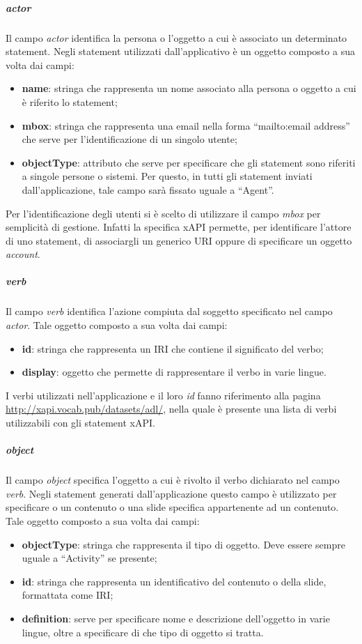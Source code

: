 \documentclass[../Tesi.tex]{subfiles}
\begin{document}
					\subparagraph{actor}
					Il campo \textit{actor} identifica la persona o l'oggetto a cui è associato un determinato statement. Negli statement utilizzati dall'applicativo è un oggetto composto a sua volta dai campi:
					\begin{itemize}
						\item \textbf{name}: stringa che rappresenta un nome associato alla persona o oggetto a cui è riferito lo statement;
						\item \textbf{mbox}: stringa che rappresenta una email nella forma ``mailto:email address'' che serve per l'identificazione di un singolo utente; 
						\item \textbf{objectType}: attributo che serve per specificare che gli statement sono riferiti a singole persone o sistemi. Per questo, in tutti gli statement inviati dall'applicazione, tale campo sarà fissato uguale a ``Agent''.
					\end{itemize}
					Per l'identificazione degli utenti si è scelto di utilizzare il campo \textit{mbox} per semplicità di gestione. Infatti la specifica xAPI permette, per identificare l'attore di uno statement, di associargli un generico URI oppure di specificare un oggetto \textit{account}.

					\subparagraph{verb}
					Il campo \textit{verb} identifica l'azione compiuta dal soggetto specificato nel campo \textit{actor}. Tale oggetto composto a sua volta dai campi:
					\begin{itemize}
						\item \textbf{id}: stringa che rappresenta un IRI che contiene il significato del verbo;
						\item \textbf{display}: oggetto che permette di rappresentare il verbo in varie lingue.
					\end{itemize}
					I verbi utilizzati nell'applicazione e il loro \textit{id} fanno riferimento alla pagina \url{http://xapi.vocab.pub/datasets/adl/}, nella quale è presente una lista di verbi utilizzabili con gli statement xAPI.

					\subparagraph{object}
					Il campo \textit{object} specifica l'oggetto a cui è rivolto il verbo dichiarato nel campo \textit{verb}. Negli statement generati dall'applicazione questo campo è utilizzato per specificare o un contenuto o una slide specifica appartenente ad un contenuto. Tale oggetto composto a sua volta dai campi:
					\begin{itemize}
						\item \textbf{objectType}: stringa che rappresenta il tipo di oggetto. Deve essere sempre uguale a ``Activity'' se presente;
						\item \textbf{id}: stringa che rappresenta un identificativo del contenuto o della slide, formattata come IRI;
						\item \textbf{definition}: serve per specificare nome e descrizione dell'oggetto in varie lingue, oltre a specificare di che tipo di oggetto si tratta.
					\end{itemize}
\end{document}
